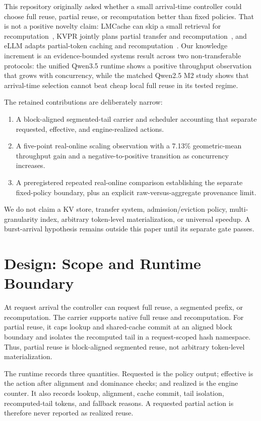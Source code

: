 \documentclass[conference]{IEEEtran}
\begin{document}
This repository originally asked whether a small arrival-time controller could
choose full reuse, partial reuse, or recomputation better than fixed policies.
That is not a positive novelty claim: LMCache can skip a small retrieval for
recomputation~\cite{lmcache}, KVPR jointly plans partial transfer and
recomputation~\cite{kvpr2025}, and eLLM adapts partial-token caching and
recomputation~\cite{ellm2026}. Our knowledge increment is an evidence-bounded
systems result across two non-transferable protocols: the unified Qwen3.5
runtime shows a positive throughput observation that grows with concurrency,
while the matched Qwen2.5 M2 study shows that arrival-time selection cannot beat
cheap local full reuse in its tested regime.

The retained contributions are deliberately narrow:
\begin{enumerate}[leftmargin=1.5em]
\item A block-aligned segmented-tail carrier and scheduler accounting that
separate requested, effective, and engine-realized actions.
\item A five-point real-online scaling observation with a 7.13\% geometric-mean
throughput gain and a negative-to-positive transition as concurrency increases.
\item A preregistered repeated real-online comparison establishing the separate
fixed-policy boundary, plus an explicit raw-versus-aggregate provenance limit.
\end{enumerate}
We do not claim a KV store, transfer system, admission/eviction policy,
multi-granularity index, arbitrary token-level materialization, or universal
speedup. A burst-arrival hypothesis remains outside this paper until its
separate gate passes.

\section{Design: Scope and Runtime Boundary}
At request arrival the controller can request full reuse, a segmented prefix,
or recomputation. The carrier supports native full reuse and recomputation. For
partial reuse, it caps lookup and shared-cache commit at an aligned block
boundary and isolates the recomputed tail in a request-scoped hash namespace.
Thus, partial reuse is block-aligned segmented reuse, not arbitrary token-level
materialization.

The runtime records three quantities. Requested is the policy output; effective
is the action after alignment and dominance checks; and realized is the engine
counter. It also records lookup, alignment, cache commit, tail isolation,
recomputed-tail tokens, and fallback reasons. A requested partial action is
therefore never reported as realized reuse.
\end{document}
